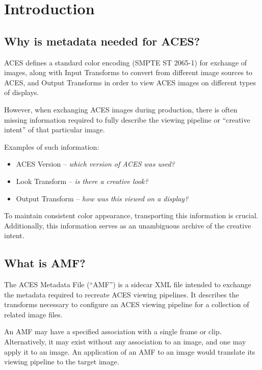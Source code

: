 \regularsectionformat	%
\chapter{Introduction}

\section{Why is metadata needed for ACES?}

ACES defines a standard color encoding (SMPTE ST 2065-1) for exchange of images, along with Input Transforms to convert from different image sources to ACES, and Output Transforms in order to view ACES images on different types of displays.

However, when exchanging ACES images during production, there is often missing information required to fully describe the viewing pipeline or ``creative intent'' of that particular image.

Examples of such information:
\begin{itemize}
    \item ACES Version -- \textit{which version of ACES was used?}
    \item Look Transform -- \textit{is there a creative look?}
    \item Output Transform -- \textit{how was this viewed on a display?}
\end{itemize}

To maintain consistent color appearance, transporting this information is crucial. Additionally, this information serves as an unambiguous archive of the creative intent.

\section{What is AMF?}
The ACES Metadata File (``AMF'') is a sidecar XML file intended to exchange the metadata required to recreate ACES viewing pipelines. It describes the transforms necessary to configure an ACES viewing pipeline for a collection of related image files.

An AMF may have a specified association with a single frame or clip. Alternatively, it may exist without any association to an image, and one may apply it to an image. An application of an AMF to an image would translate its viewing pipeline to the target image.

